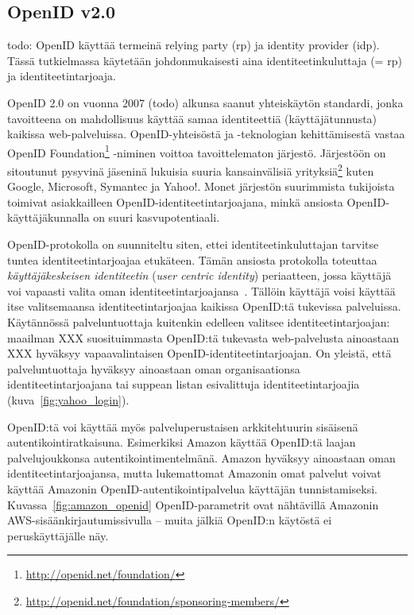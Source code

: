 \documentclass[finnish,gradu]{tktltiki}
\begin{document}


  \subsection{OpenID v2.0} %
  \label{sub:openid}

  todo: OpenID käyttää termeinä relying party (rp) ja identity provider (idp). Tässä tutkielmassa käytetään johdonmukaisesti aina identiteetinkuluttaja (= rp) ja identiteetintarjoaja.

  OpenID 2.0 on vuonna 2007 (todo) alkunsa saanut yhteiskäytön standardi, jonka tavoitteena on mahdollisuus käyttää samaa identiteettiä (käyttäjätunnusta) kaikissa web-palveluissa. OpenID-yhteisöstä ja -teknologian kehittämisestä vastaa OpenID Foundation\footnote{\url{http://openid.net/foundation/}} -niminen voittoa tavoittelematon järjestö. Järjestöön on sitoutunut pysyvinä jäseninä lukuisia suuria kansainvälisiä yrityksiä\footnote{\url{http://openid.net/foundation/sponsoring-members/}} kuten Google, Microsoft, Symantec ja Yahoo!. Monet järjestön suurimmista tukijoista toimivat asiakkailleen OpenID-identiteetintarjoajana, minkä ansiosta OpenID-käyttäjäkunnalla on suuri kasvupotentiaali.

  OpenID-protokolla on suunniteltu siten, ettei identiteetinkuluttajan tarvitse tuntea identiteetintarjoajaa etukäteen. Tämän ansiosta protokolla toteuttaa \emph{käyttäjäkeskeisen identiteetin} (\emph{user centric identity}) periaatteen, jossa käyttäjä voi vapaasti valita oman identiteetintarjoajansa~\cite{openid_recordon_2009}. Tällöin käyttäjä voisi käyttää itse valitsemaansa identiteetintarjoajaa kaikissa OpenID:tä tukevissa palveluissa. Käytännössä palveluntuottaja kuitenkin edelleen valitsee identiteetintarjoajan: maailman XXX suosituimmasta OpenID:tä tukevasta web-palvelusta ainoastaan XXX hyväksyy vapaavalintaisen OpenID-identiteetintarjoajan. On yleistä, että palveluntuottaja hyväksyy ainoastaan oman organisaationsa identiteetintarjoajana tai suppean listan esivalittuja identiteetintarjoajia (kuva~\ref{fig:yahoo_login}).

  OpenID:tä voi käyttää myös palveluperustaisen arkkitehtuurin sisäisenä autentikointiratkaisuna. Esimerkiksi Amazon käyttää OpenID:tä laajan palvelujoukkonsa autentikointimentelmänä. Amazon hyväksyy ainoastaan oman identiteetintarjoajansa, mutta lukemattomat Amazonin omat palvelut voivat käyttää Amazonin OpenID-autentikointipalvelua käyttäjän tunnistamiseksi. Kuvassa~\ref{fig:amazon_openid} OpenID-parametrit ovat nähtävillä Amazonin AWS-sisäänkirjautumissivulla -- muita jälkiä OpenID:n käytöstä ei peruskäyttäjälle näy.
\end{document}
